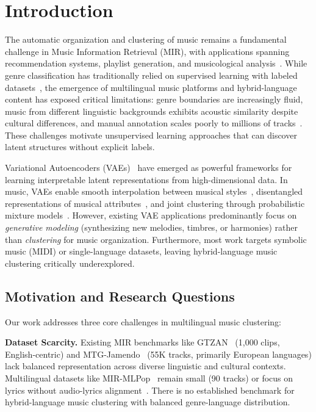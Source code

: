 \documentclass[10pt,twocolumn]{article}
\begin{document}
\section{Introduction}

The automatic organization and clustering of music remains a fundamental challenge in Music Information Retrieval (MIR), with applications spanning recommendation systems, playlist generation, and musicological analysis~\cite{schedule2013music}. While genre classification has traditionally relied on supervised learning with labeled datasets~\cite{li2003comparative}, the emergence of multilingual music platforms and hybrid-language content has exposed critical limitations: genre boundaries are increasingly fluid, music from different linguistic backgrounds exhibits acoustic similarity despite cultural differences, and manual annotation scales poorly to millions of tracks~\cite{sturm2014state}. These challenges motivate unsupervised learning approaches that can discover latent structures without explicit labels.

Variational Autoencoders (VAEs)~\cite{kingma2013auto} have emerged as powerful frameworks for learning interpretable latent representations from high-dimensional data. In music, VAEs enable smooth interpolation between musical styles~\cite{roberts2018hierarchical}, disentangled representations of musical attributes~\cite{higgins2017beta}, and joint clustering through probabilistic mixture models~\cite{jiang2017variational}. However, existing VAE applications predominantly focus on \emph{generative modeling} (synthesizing new melodies, timbres, or harmonies) rather than \emph{clustering} for music organization. Furthermore, most work targets symbolic music (MIDI) or single-language datasets, leaving hybrid-language music clustering critically underexplored.

\subsection{Motivation and Research Questions}

Our work addresses three core challenges in multilingual music clustering:

\textbf{Dataset Scarcity.} Existing MIR benchmarks like GTZAN~\cite{tzanetakis2002musical} (1,000 clips, English-centric) and MTG-Jamendo~\cite{bogdanov2019mtg} (55K tracks, primarily European languages) lack balanced representation across diverse linguistic and cultural contexts. Multilingual datasets like MIR-MLPop~\cite{wang2024mir} remain small (90 tracks) or focus on lyrics without audio-lyrics alignment~\cite{hossain2018banglastyle}. There is no established benchmark for hybrid-language music clustering with balanced genre-language distribution.
\end{document}
